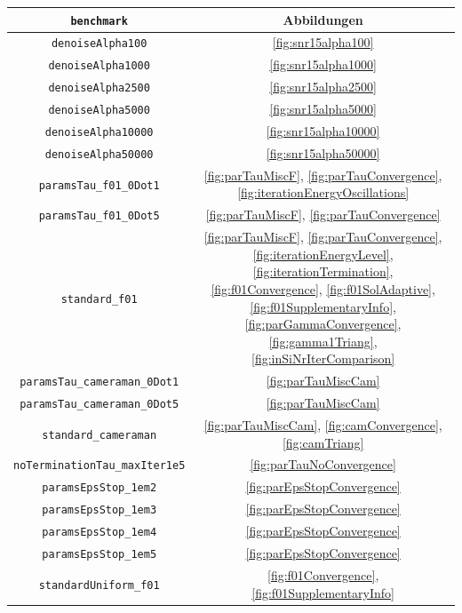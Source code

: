 \begin{table}[p]
  \centering
  \begin{tabular}{c|c}
    \hline
    \texttt{benchmark} & Abbildungen\\  
    \hline 
    \texttt{denoiseAlpha100} &
    \ref{fig:snr15alpha100}\\
    \texttt{denoiseAlpha1000} &
    \ref{fig:snr15alpha1000}\\
    \texttt{denoiseAlpha2500} &
    \ref{fig:snr15alpha2500}\\
    \texttt{denoiseAlpha5000} &
    \ref{fig:snr15alpha5000}\\
    \texttt{denoiseAlpha10000} &
    \ref{fig:snr15alpha10000}\\
    \texttt{denoiseAlpha50000} &
    \ref{fig:snr15alpha50000}\\
    \texttt{paramsTau\_f01\_0Dot1} &
    \ref{fig:parTauMiscF}, \ref{fig:parTauConvergence},
    \ref{fig:iterationEnergyOscillations}\\
    \texttt{paramsTau\_f01\_0Dot5} &
    \ref{fig:parTauMiscF}, \ref{fig:parTauConvergence}\\
    \texttt{standard\_f01} &
    \ref{fig:parTauMiscF}, \ref{fig:parTauConvergence}, 
    \ref{fig:iterationEnergyLevel}, \ref{fig:iterationTermination},
    \ref{fig:f01Convergence}, \ref{fig:f01SolAdaptive},
    \ref{fig:f01SupplementaryInfo}, \ref{fig:parGammaConvergence},
    \ref{fig:gamma1Triang}, \ref{fig:inSiNrIterComparison}\\
    \texttt{paramsTau\_cameraman\_0Dot1} &
    \ref{fig:parTauMiscCam}\\
    \texttt{paramsTau\_cameraman\_0Dot5} &
    \ref{fig:parTauMiscCam} \\
    \texttt{standard\_cameraman} &
    \ref{fig:parTauMiscCam}, \ref{fig:camConvergence}, \ref{fig:camTriang}\\
    \texttt{noTerminationTau\_maxIter1e5} &
    \ref{fig:parTauNoConvergence}\\
    \texttt{paramsEpsStop\_1em2} &
    \ref{fig:parEpsStopConvergence}\\
    \texttt{paramsEpsStop\_1em3} &
    \ref{fig:parEpsStopConvergence}\\
    \texttt{paramsEpsStop\_1em4} &
    \ref{fig:parEpsStopConvergence}\\
    \texttt{paramsEpsStop\_1em5} &
    \ref{fig:parEpsStopConvergence}\\
    \texttt{standardUniform\_f01} &
    \ref{fig:f01Convergence}, \ref{fig:f01SupplementaryInfo}\\

\end{tabular}
\end{table}
